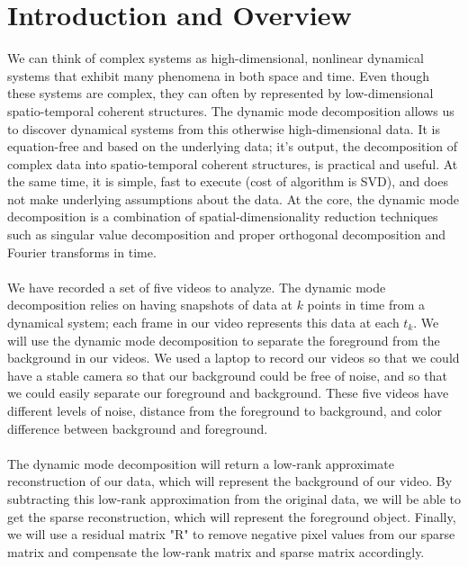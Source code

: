 \documentclass{article}
\begin{document}
\section*{\fontsize{19}{15}\selectfont Introduction and Overview}
	We can think of complex systems as high-dimensional, nonlinear dynamical systems that exhibit many phenomena in both space and time. Even though these systems are complex, they can often by represented by low-dimensional spatio-temporal coherent structures. The dynamic mode decomposition allows us to discover dynamical systems from this otherwise high-dimensional data. It is equation-free and based on the underlying data; it's output, the decomposition of complex data into spatio-temporal coherent structures, is practical and useful. At the same time, it is simple, fast to execute (cost of algorithm is SVD), and does not make underlying assumptions about the data. At the core, the dynamic mode decomposition is a combination of spatial-dimensionality reduction techniques such as singular value decomposition and proper orthogonal decomposition and Fourier transforms in time. \\ \\
	We have recorded a set of five videos to analyze. The dynamic mode decomposition relies on having snapshots of data at $k$ points in time from a dynamical system; each frame in our video represents this data at each $t_k$. We will use the dynamic mode decomposition to separate the foreground from the background in our videos. We used a laptop to record our videos so that we could have a stable camera so that our background could be free of noise, and so that we could easily separate our foreground and background. These five videos have different levels of noise, distance from the foreground to background, and color difference between background and foreground. \\ \\ 
	The dynamic mode decomposition will return a low-rank approximate reconstruction of our data, which will represent the background of our video. By subtracting this low-rank approximation from the original data, we will be able to get the sparse reconstruction, which will represent the foreground object. Finally, we will use a residual matrix "R" to remove negative pixel values from our sparse matrix and compensate the low-rank matrix and sparse matrix accordingly.
\end{document}
